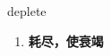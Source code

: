 
\begin{frame}
{\huge deplete}
\begin{center}
\begin{enumerate}\Large
  \item \textbf{耗尽，使衰竭}
\end{enumerate}
\end{center}
\end{frame}
